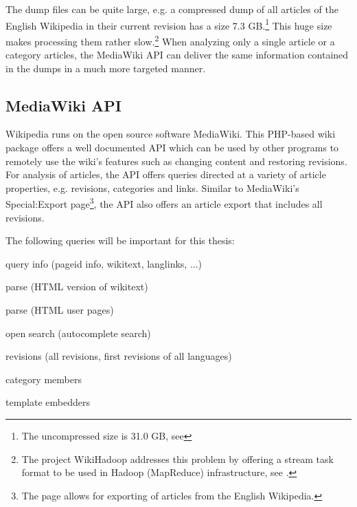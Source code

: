 The dump files can be quite large, e.g. a compressed dump of all articles of the English Wikipedia in their current revision has a size 7.3 GB.\footnote{The uncompressed size is 31.0 GB, see }
This huge size makes processing them rather slow.\footnote{The project WikiHadoop addresses this problem by offering a stream task format to be used in Hadoop (MapReduce) infrastructure, see .}
When analyzing only a single article or a category articles, the MediaWiki API can deliver the same information contained in the dumps in a much more targeted manner. 

\subsection{MediaWiki API}

Wikipedia runs on the open source software MediaWiki.
This PHP-based wiki package offers a well documented API which can be used by other programs to remotely use the wiki's features such as changing content and restoring revisions.
For analysis of articles, the API offers queries directed at a variety of article properties, e.g. revisions, categories and links.
Similar to MediaWiki's Special:Export page\footnote{The page  allows for exporting of articles from the English Wikipedia.}, the API also offers an article export that includes all revisions.


The following queries will be important for this thesis:

\begin{todos}
    \item query info (pageid info, wikitext, langlinks, ...)
    \item parse (HTML version of wikitext)
    \item parse (HTML user pages)
    \item open search (autocomplete search)
    \item revisions (all revisions, first revisions of all languages)
    \item category members
    \item template embedders
\end{todos}


